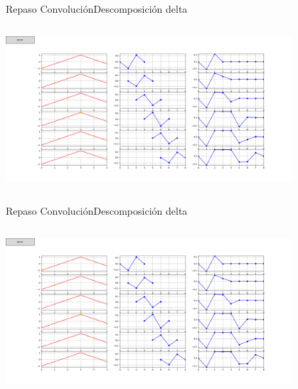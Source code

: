 \begin{frame}{Repaso Convolución}{Descomposición delta}
   \begin{columns}[c]
      \begin{column}{1\textwidth}
         \centering\includegraphics[width=0.8\textwidth]{4_clase/descomposicion_delta}
      \end{column}
   \end{columns}
   \vfill
\end{frame}
\begin{frame}{Repaso Convolución}{Descomposición delta}
   \begin{columns}[c]
      \begin{column}{1\textwidth}
         \centering\includegraphics[width=0.8\textwidth]{4_clase/descomposicion_delta}
      \end{column}
   \end{columns}
   \vfill
\end{frame}
